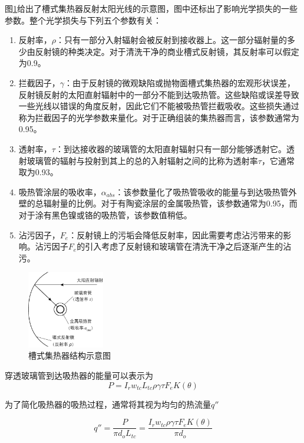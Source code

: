图\ref{fig:ParabolicTrough}给出了槽式集热器反射太阳光线的示意图，图中还标出了影响光学损失的一些参数。整个光学损失与下列五个参数有关：

\begin{enumerate}[label=(\arabic*)]
  \item 反射率，$\rho$：只有一部分入射辐射会被反射到接收器上。这一部分辐射量的多少由反射镜的种类决定。对于清洗干净的商业槽式反射镜，其反射率可以假定为0.9。
  \item 拦截因子，$\gamma$：由于反射镜的微观缺陷或抛物面槽式集热器的宏观形状误差，反射镜反射的太阳直射辐射中的一部分不能到达吸热管。这些缺陷或误差导致一些光线以错误的角度反射，因此它们不能被吸热管拦截吸收。这些损失通过称为拦截因子的光学参数来量化。对于正确组装的集热器而言，该参数通常为0.95。
  \item 透射率，$\tau$：到达接收器的玻璃管的太阳直射辐射只有一部分能够透射它。透射玻璃管的辐射与投射到其上的总的入射辐射之间的比称为透射率$\tau$，它通常取为0.93。
  \item 吸热管涂层的吸收率，$\alpha_{abs}$：该参数量化了吸热管吸收的能量与到达吸热管外壁的总辐射量的比例。对于有陶瓷涂层的金属吸热管，该参数通常为0.95，而对于涂有黑色镍或铬的吸热管，该参数值稍低。
  \item 沾污因子，$F_e$：反射镜上的污垢会降低反射率，因此需要考虑沾污带来的影响。沾污因子$F_e$的引入考虑了反射镜和玻璃管在清洗干净之后逐渐产生的沾污。
\end{enumerate}

\begin{figure}[!ht]
\centering
\includegraphics[width=0.3\textwidth]{fig/ParametersOfParabolicDish.pdf}
\caption{槽式集热器结构示意图}\label{fig:ParabolicTrough}
\end{figure}

穿透玻璃管到达吸热器的能量可以表示为
\begin{equation}
  P = I_r w_{tc} L_{tc} \rho \gamma \tau F_e K(\theta)
\end{equation}

为了简化吸热器的吸热过程，通常将其视为均匀的热流量$q''$

\begin{equation}
  q''= \frac{P}{\pi d_o L_{tc}} = \frac{I_r w_{tc} \rho \gamma \tau F_e K(\theta)}{\pi d_o}
\end{equation}

